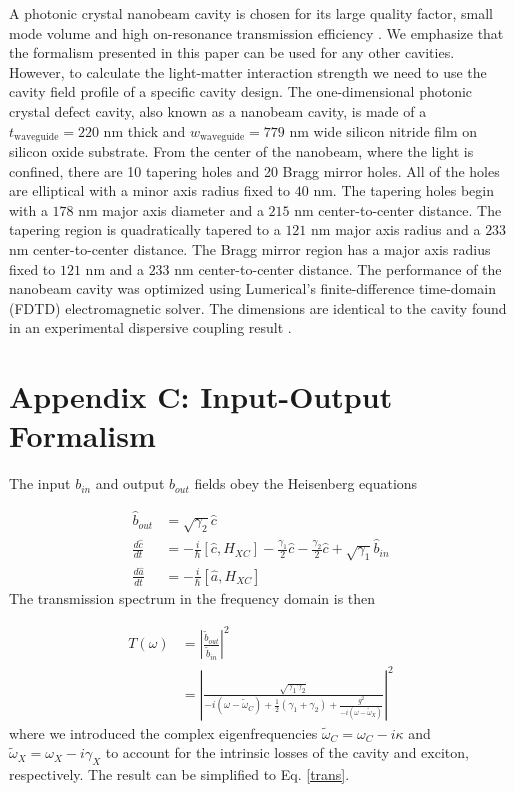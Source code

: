 \documentclass{achemso}
\begin{document}
A photonic crystal nanobeam cavity is chosen for its large quality factor, small mode volume and high on-resonance transmission efficiency \cite{quan_deterministic_2011}. We emphasize that the formalism presented in this paper can be used for any other cavities. However, to calculate the light-matter interaction strength we need to use the cavity field profile of a specific cavity design. The one-dimensional photonic crystal defect cavity, also known as a nanobeam cavity, is made of a $t_{\mathrm{waveguide}} = 220$ \si{\nano\meter} thick and  $w_{\mathrm{waveguide}} = 779$ \si{\nano\meter} wide silicon nitride film on silicon oxide substrate. From the center of the nanobeam, where the light is confined, there are 10 tapering holes and 20 Bragg mirror holes. All of the holes are elliptical with a minor axis radius fixed to $40$ \si{\nano\meter}. The tapering holes begin with a $178$ \si{\nano\meter} major axis diameter and a $215$ \si{\nano\meter} center-to-center distance. The tapering region is quadratically tapered to a $121$ \si{\nano\meter} major axis radius and a $233$ \si{\nano\meter} center-to-center distance. The Bragg  mirror region has a major axis radius fixed to $121$ \si{\nano\meter} and a $233$ \si{\nano\meter} center-to-center distance. The performance of the nanobeam cavity was optimized using Lumerical's finite-difference time-domain (FDTD) electromagnetic solver. The dimensions are identical to the cavity found in an experimental dispersive coupling result \cite{rosser_dispersive_2020}. 

\section*{Appendix C: Input-Output Formalism}
\setcounter{equation}{0}
\renewcommand{\theequation}{C\arabic{equation}}

The input $b_{in}$ and output $b_{out}$ fields obey the Heisenberg equations

\begin{align}
	\hat{b}_{out} & = \sqrt{\gamma_{2}} \hat{c} \\
	\frac{d\hat{c}}{dt} & = -\frac{i}{\hbar} [\hat{c},H_{XC}] - \frac{\gamma_{1}}{2} \hat{c} - \frac{\gamma_{2}}{2} \hat{c} + \sqrt{\gamma_{1}} \hat{b}_{in} \\
	\frac{d\hat{a}}{dt} & = -\frac{i}{\hbar} [\hat{a},H_{XC}]
\end{align}
The transmission spectrum in the frequency domain is then

\begin{align}
	T(\omega) & = \left| \frac{\tilde{b}_{out}}{\tilde{b}_{in}}\right|^2 \\
	& = \left| \frac{\sqrt{\gamma_{1} \gamma_{2}}}{-i (\omega - \tilde{\omega}_{C}) + \frac{1}{2} (\gamma_{1} + \gamma_{2}) + \frac{g^2}{-i (\omega - \tilde{\omega}_{X})}} \right|^2
\end{align}
where we introduced the complex eigenfrequencies $\tilde{\omega}_{C} = \omega_{C} - i \kappa$ and $\tilde{\omega}_{X} = \omega_{X} - i \gamma_{X}$ to account for the intrinsic losses of the cavity and exciton, respectively. The result can be simplified to Eq. \ref{trans}.
\end{document}
